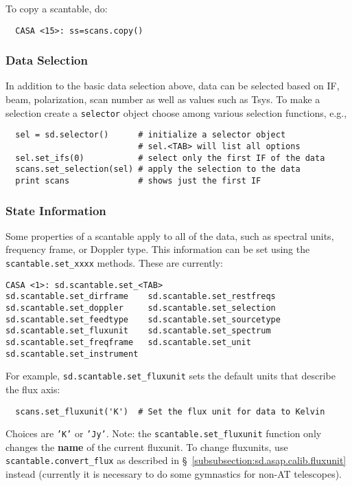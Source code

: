 To copy a scantable, do:

\small
\begin{verbatim}
  CASA <15>: ss=scans.copy()
\end{verbatim}
\normalsize

\subsubsection{Data Selection}
\label{subsubsection:sd.asap.scantable.select}

In addition to the basic data selection above, data can be selected
based on IF, beam, polarization, scan number as well as values such as
Tsys.  To make a selection create a {\tt selector} object choose among various
selection functions, e.g., 

\small
\begin{verbatim}
  sel = sd.selector()      # initialize a selector object
                           # sel.<TAB> will list all options
  sel.set_ifs(0)           # select only the first IF of the data
  scans.set_selection(sel) # apply the selection to the data
  print scans              # shows just the first IF
\end{verbatim}
\normalsize

\subsubsection{State Information}
\label{subsubsection:sd.asap.scantable.state}

Some properties of a scantable apply to all of the data, such as
spectral units, frequency frame, or Doppler type. This
information can be set using the %
{\tt scantable.set\_xxxx}
methods.  These are currently:
\small
\begin{verbatim}
CASA <1>: sd.scantable.set_<TAB>
sd.scantable.set_dirframe    sd.scantable.set_restfreqs
sd.scantable.set_doppler     sd.scantable.set_selection
sd.scantable.set_feedtype    sd.scantable.set_sourcetype
sd.scantable.set_fluxunit    sd.scantable.set_spectrum
sd.scantable.set_freqframe   sd.scantable.set_unit
sd.scantable.set_instrument  
\end{verbatim}
\normalsize

For example, {\tt sd.scantable.set\_fluxunit} sets the default units
that describe the flux axis:
\small
\begin{verbatim}
  scans.set_fluxunit('K')  # Set the flux unit for data to Kelvin
\end{verbatim}
\normalsize
Choices are {\tt 'K'} or {\tt 'Jy'}.
Note: the {\tt scantable.set\_fluxunit} function only changes the {\bf name}
of the current fluxunit. To change fluxunits, use 
{\tt scantable.convert\_flux} as described in 
\S~\ref{subsubsection:sd.asap.calib.fluxunit}
instead (currently it is necessary to do some gymnastics for non-AT
telescopes).

